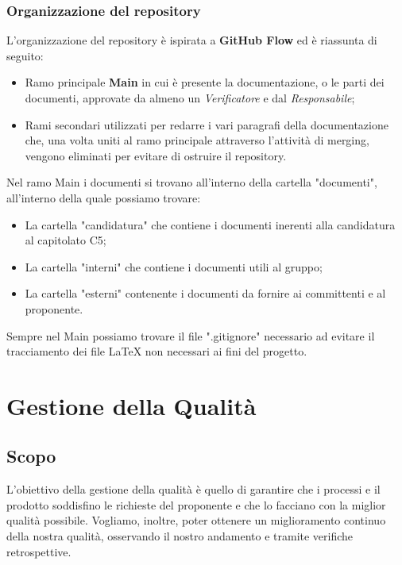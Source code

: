   \subsubsection{Organizzazione del repository}
  L'organizzazione del repository è ispirata a \textbf{GitHub Flow} ed è riassunta di seguito:
  \begin{itemize}
      \item Ramo principale \textbf{Main} in cui è presente la documentazione, o le parti dei documenti, approvate da almeno un \textit{Verificatore} e dal \textit{Responsabile};
      \item Rami secondari utilizzati per redarre i vari paragrafi della documentazione che, una volta uniti al ramo principale attraverso l'attività di merging, vengono eliminati per evitare di ostruire il repository.
  \end{itemize}
  Nel ramo Main i documenti si trovano all'interno della cartella "documenti", all'interno della quale possiamo trovare:
  \begin{itemize}
      \item La cartella "candidatura" che contiene i documenti inerenti alla candidatura al capitolato C5;
      \item La cartella "interni" che contiene i documenti utili al gruppo;
      \item La cartella "esterni" contenente i documenti da fornire ai committenti e al proponente.
  \end{itemize}
  Sempre nel Main possiamo trovare il file ".gitignore" necessario ad evitare il tracciamento dei file \LaTeX{} non necessari ai fini del progetto.


\section{Gestione della Qualità}
  \subsection{Scopo}
  L'obiettivo della gestione della qualità è quello di garantire
  che i processi e il prodotto soddisfino le richieste del proponente
  e che lo facciano con la miglior qualità possibile.
  \newline
  Vogliamo, inoltre, poter ottenere un miglioramento continuo della nostra
  qualità, osservando il nostro andamento e tramite verifiche retrospettive.

